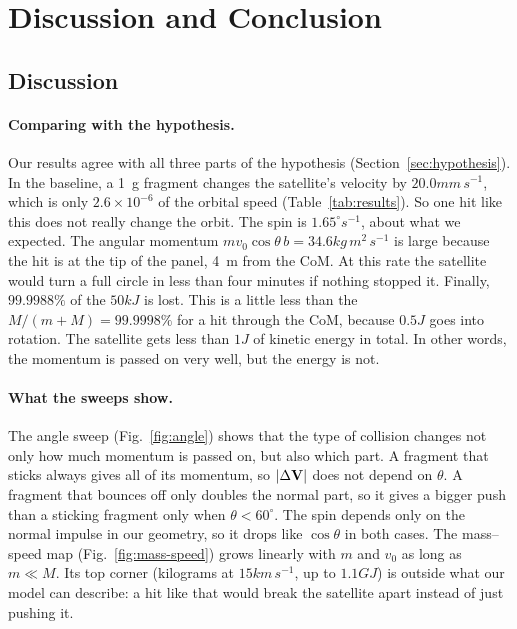 \clearpage
\section{Discussion and Conclusion}
\label{sec:discussion}

\subsection{Discussion}

\paragraph{Comparing with the hypothesis.}
Our results agree with all three parts of the hypothesis
(Section~\ref{sec:hypothesis}). In the baseline, a 1~g fragment changes
the satellite's velocity by $20.0\unit{mm\,s^{-1}}$, which is only
$2.6\times10^{-6}$ of the orbital speed (Table~\ref{tab:results}). So one
hit like this does not really change the orbit. The spin is
$1.65^\circ\unit{s^{-1}}$, about what we expected. The angular momentum
$m v_0\cos\theta\, b=34.6\unit{kg\,m^2\,s^{-1}}$ is large because the hit
is at the tip of the panel, 4~m from the CoM. At this rate the satellite
would turn a full circle in less than four minutes if nothing stopped it.
Finally, $99.9988\%$ of the $50\unit{kJ}$ is lost. This is a little less
than the $M/(m+M)=99.9998\%$ for a hit through the CoM, because
$0.5\unit{J}$ goes into rotation. The satellite gets less than $1\unit{J}$
of kinetic energy in total. In other words, the momentum is passed on
very well, but the energy is not.

\paragraph{What the sweeps show.}
The angle sweep (Fig.~\ref{fig:angle}) shows that the type of collision
changes not only how much momentum is passed on, but also which part. A
fragment that sticks always gives all of its momentum, so $|\Delta\mathbf{V}|$
does not depend on $\theta$. A fragment that bounces off only doubles the
normal part, so it gives a bigger push than a sticking fragment only when
$\theta<60^\circ$. The spin depends only on the normal impulse in our
geometry, so it drops like $\cos\theta$ in both cases. The mass--speed map
(Fig.~\ref{fig:mass-speed}) grows linearly with $m$ and $v_0$ as long as
$m\ll M$. Its top corner (kilograms at $15\unit{km\,s^{-1}}$, up to
$1.1\unit{GJ}$) is outside what our model can describe: a hit like that
would break the satellite apart instead of just pushing it.

